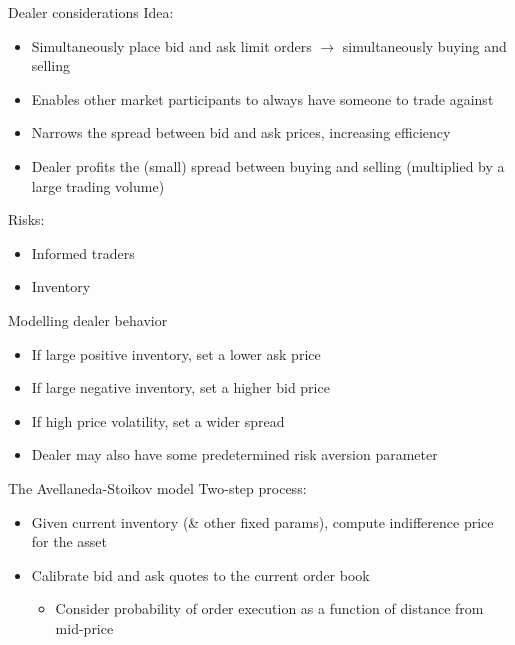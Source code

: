\documentclass{beamer} %
\begin{document}
\begin{frame}{Dealer considerations}
    Idea:
    \begin{itemize}
        \item Simultaneously place bid and ask limit orders $\rightarrow$ simultaneously buying and selling
        \item Enables other market participants to always have someone to trade against
        \item Narrows the spread between bid and ask prices, increasing efficiency
        \item Dealer profits the (small) spread between buying and selling (multiplied by a large trading volume)
    \end{itemize}
    Risks:
    \begin{itemize}
        \item Informed traders
        \item Inventory
    \end{itemize}
\end{frame}

\begin{frame}{Modelling dealer behavior}
    \begin{itemize}
        \item If large positive inventory, set a lower ask price
        \item If large negative inventory, set a higher bid price
        \item If high price volatility, set a wider spread 
        \item Dealer may also have some predetermined risk aversion parameter
    \end{itemize}
\end{frame}

\begin{frame}{The Avellaneda-Stoikov model}
    Two-step process:
    \begin{itemize}
        \item Given current inventory (\& other fixed params), compute indifference price for the asset
        \item Calibrate bid and ask quotes to the current order book
        \begin{itemize}
            \item Consider probability of order execution as a function of distance from mid-price
        \end{itemize}
    \end{itemize}
\end{frame}
\end{document}
